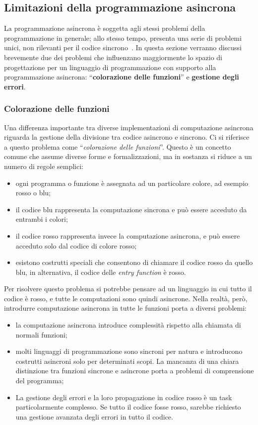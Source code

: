 \documentclass[12pt,a4paper,openright,twoside]{book}
\begin{document}
\subsection{Limitazioni della programmazione asincrona}
\label{sec:async-limitation}
La programmazione asincrona è soggetta agli stessi problemi della programmazione in generale; allo stesso tempo, presenta una serie di problemi unici, non rilevanti per il codice sincrono~\cite{DBLP:conf/oopsla/ElizarovBAU21}. In questa sezione verranno discussi brevemente due dei problemi che influenzano maggiormente lo spazio di progettazione per un linguaggio di programmazione con supporto alla programmazione asincrona: ``\textbf{colorazione delle funzioni}'' e \textbf{gestione degli errori}.

\subsubsection{Colorazione delle funzioni}
Una differenza importante tra diverse implementazioni di computazione asincrona riguarda la gestione della divisione tra codice asincrono e sincrono. Ci si riferisce a questo problema come ``\textit{colorazione delle funzioni}''.
Questo è un concetto comune che assume diverse forme e formalizzazioni, ma in sostanza si riduce a un numero di regole semplici: 
\begin{itemize}
    \item ogni programma o funzione è assegnata ad un particolare colore, ad esempio rosso o blu; 
    \item il codice blu rappresenta la computazione sincrona e può essere acceduto da entrambi i colori; 
    \item il codice rosso rappresenta invece la computazione asincrona, e può essere acceduto solo dal codice di colore rosso;  
    \item esistono costrutti speciali che consentono di chiamare il codice rosso da quello blu, in alternativa, il codice delle \textit{entry function} è rosso. 
\end{itemize}
Per risolvere questo problema si potrebbe pensare ad un linguaggio in cui tutto il codice è rosso, e tutte le computazioni sono quindi asincrone. Nella realtà, però, introdurre computazione asincrona in tutte le funzioni porta a diversi problemi: 
\begin{itemize}
    \item la computazione asincrona introduce complessità rispetto alla chiamata di normali funzioni;
    \item molti linguaggi di programmazione sono sincroni per natura e introducono costrutti asincroni solo per determinati scopi. La mancanza di una chiara distinzione tra funzioni sincrone e asincrone porta a problemi di comprensione del programma;
    \item La gestione degli errori e la loro propagazione in codice rosso è un task particolarmente complesso. Se tutto il codice fosse rosso, sarebbe richiesto una gestione avanzata degli errori in tutto il codice.  
\end{itemize}
\end{document}
